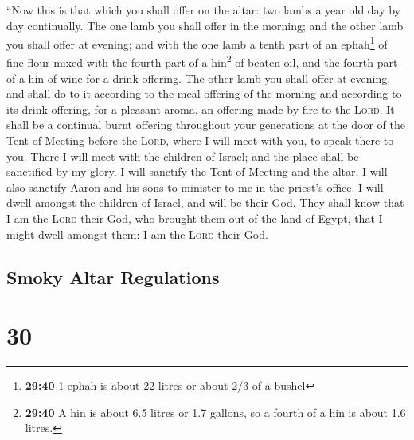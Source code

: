  ``Now this is that which you shall offer on the altar:
two lambs a year old day by day continually.  The one
lamb you shall offer in the morning; and the other lamb you shall offer
at evening;  and with the one lamb a tenth part of an
ephah\footnote{\textbf{29:40} 1 ephah is about 22 litres or about 2/3 of
  a bushel} of fine flour mixed with the fourth part of a hin\footnote{\textbf{29:40}
  A hin is about 6.5 litres or 1.7 gallons, so a fourth of a hin is
  about 1.6 litres.} of beaten oil, and the fourth part of a hin of wine
for a drink offering.  The other lamb you shall offer at
evening, and shall do to it according to the meal offering of the
morning and according to its drink offering, for a pleasant aroma, an
offering made by fire to the \textsc{Lord}.  It shall be
a continual burnt offering throughout your generations at the door of
the Tent of Meeting before the \textsc{Lord}, where I will meet with
you, to speak there to you.  There I will meet with the
children of Israel; and the place shall be sanctified by my glory.
 I will sanctify the Tent of Meeting and the altar. I
will also sanctify Aaron and his sons to minister to me in the priest's
office.  I will dwell amongst the children of Israel, and
will be their God.  They shall know that I am the
\textsc{Lord} their God, who brought them out of the land of Egypt, that
I might dwell amongst them: I am the \textsc{Lord} their God.

\hypertarget{smoky-altar-regulations}{%
\subsection{Smoky Altar Regulations}\label{smoky-altar-regulations}}

\hypertarget{section-29}{%
\section{30}\label{section-29}}

